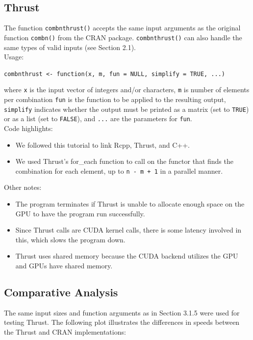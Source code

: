 \subsection{Thrust}

The function \texttt{combnthrust()} accepts the same input arguments as the original function \texttt{combn()} from the CRAN package. \texttt{combnthrust()} can also handle the same types of valid inputs (see Section 2.1).\\
\null
Usage:\\
\null

\texttt{combnthrust <- function(x, m, fun = NULL, simplify = TRUE, ...)}\\
\null

where \texttt{x} is the input vector of integers and/or characters, \texttt{m} is number of elements per combination
\texttt{fun} is the function to be applied to the resulting output, \texttt{simplify} indicates whether the output must be printed as a matrix (set to \texttt{TRUE}) or as a list (set to \texttt{FALSE}), and \texttt{...} are the parameters for \texttt{fun}.\\

\null
Code highlights:\\
\begin{itemize}
\item We followed this tutorial \cite{matlofftutorial} to link Rcpp, Thrust, and C++.
\item We used Thrust's  for\_each function to call on the functor that finds the combination for each element, up to \texttt{n - m + 1} in a parallel manner. 
\end{itemize}
Other notes:
\begin{itemize}
\item The program terminates if Thrust is unable to allocate enough space on the GPU to have the program run successfully. 
\item Since Thrust calls are CUDA kernel calls, there is some latency involved in this, which slows the program down. 
\item Thrust uses shared memory because the CUDA backend utilizes the GPU and GPUs have shared memory. 
\end{itemize}


\subsection{Comparative Analysis}
The same input sizes and function arguments as in Section 3.1.5 were used for testing Thrust. The following plot illustrates the differences in speeds between the Thrust and CRAN implementations:\\
\null

